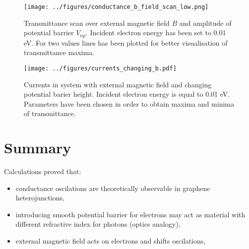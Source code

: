 \documentclass{beamer}
\begin{document}
\begin{frame}
    \begin{figure}
        \begin{center}
            \texttt{[image: ../figures/conductance\_b\_field\_scan\_low.png]}
        \end{center}
        \caption{Transmittance scan over external magnetic field $B$ and amplitude of potential barrier $V_{np}$. Incident electron energy has been set to 0.01 eV. For two values lines has been plotted for better visualisation of transmittance maxima.}
    \end{figure}
\end{frame}

\begin{frame}
    \begin{figure}
        \begin{center}
            \texttt{[image: ../figures/currents\_changing\_b.pdf]}
        \end{center}
        \caption{Currents in system with external magnetic field and changing potential barier height. Incident electron energy is equal to 0.01 eV. Parameters have been chosen in order to obtain maxima and minima of transmittance.}
    \end{figure}
\end{frame}

\section{Summary}

\begin{frame}
    Calculations proved that:
    \begin{itemize}
        \item conductance oscilations are theoretically observable in graphene heterojunctions, 
        \item introducing smooth potential barrier for electrons may act as material with different refractive index for photons (optics analogy),
        \item external magnetic field acts on electrons and shifts oscilations,
    \end{itemize}
\end{frame}

\frame{\titlepage}
\end{document}
